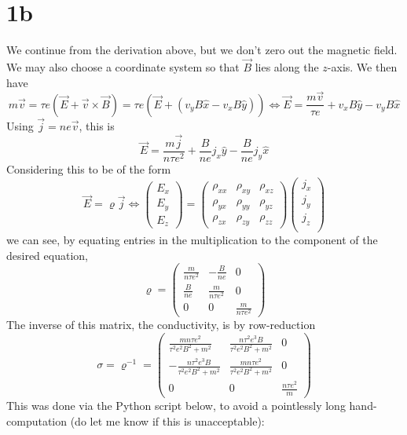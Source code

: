 \documentclass{article}
\begin{document}
\section*{1b}
We continue from the derivation above, but we don't zero out the magnetic field. We may also choose a coordinate system so that $\vec{B}$ lies along the $z$-axis. We then have
\[m\vec{v}=\tau e\left( \vec{E}+\vec{v}\times \vec{B}\right) =\tau e\left( \vec{E}+(v_yB\hat{x}-v_xB\hat{y}) \right)\Leftrightarrow \vec{E}=\frac{m\vec{v}}{\tau e}+v_xB\hat{y}-v_yB\hat{x}\]
Using $\vec{j}=ne\vec{v}$, this is
\[\vec{E}=\frac{m\vec{j}}{n\tau e^2}+\frac{B}{ne}j_x\hat{y}-\frac{B}{ne}j_y\hat{x}\]
Considering this to be of the form
\[\vec{E}=\mathbf{\varrho}\vec{j}\Leftrightarrow
  \begin{pmatrix}
    E_x \\
    E_y \\
    E_z
  \end{pmatrix}
  =
  \begin{pmatrix}
    \rho_{xx} & \rho_{xy} & \rho_{xz} \\
    \rho_{yx} & \rho_{yy} & \rho_{yz} \\
    \rho_{zx} & \rho_{zy} & \rho_{zz}
  \end{pmatrix}
  \begin{pmatrix}
    j_{x}\\
    j_{y} \\
    j_{z}\\
  \end{pmatrix}
\]
we can see, by equating entries in the multiplication to the component of the desired equation,
\[\mathbf{\varrho}=
  \begin{pmatrix}
    \frac{m}{n\tau e^{2}} & -\frac{B}{ne} & 0 \\
    \frac{B}{ne} & \frac{m}{n\tau e^{2}} & 0 \\
    0 & 0 & \frac{m}{n\tau e^{2}}
  \end{pmatrix}
\]
The inverse of this matrix, the conductivity, is by row-reduction
\[\sigma=\varrho^{-1}=
  \begin{pmatrix}
    \frac{mn\tau e^2}{\tau^2e^2B^2+m^2} & \frac{n\tau^2e^3B}{\tau^2e^2B^2+m^2} & 0\\
    -\frac{n\tau^2e^3B}{\tau^2e^2B^2+m^2} & \frac{mn\tau e^2}{\tau^2e^2B^2+m^2} &0 \\
    0 & 0 & \frac{n\tau e^{2}}{m}
  \end{pmatrix}
\]
This was done via the Python script below, to avoid a pointlessly long hand-computation (do let me know if this is unacceptable):
\end{document}
